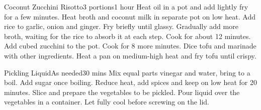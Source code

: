 \documentclass[]{article}
\begin{document}
\begin{center}
\begin{recipe}{Coconut Zucchini Risotto}{3 portions}{1 hour}
	Heat oil in a pot and add lightly fry for a few minutes.
	Heat broth and coconut milk in separate pot on low heat.
	Add rice to garlic, onion and ginger. 
	Fry briefly until glassy.
	\newstep
	Gradually add more broth, waiting for the rice to absorb it at each step.
	Cook for about 12 minutes.
	Add cubed zucchini to the pot. 
	Cook for 8 more minutes.
	Dice tofu and marinade with other ingredients.
	Heat a pan on medium-high heat and fry tofu until crispy.
	\freeform\hrulefill
\end{recipe}

\begin{recipe}{Pickling Liquid}{As needed}{30 mins}
	Mix equal parts vinegar and water, bring to a boil.
	Add sugar once boiling.
	Reduce heat, add spices and keep on low heat for 20 minutes.
	\newstep
	\freeform Slice and prepare the vegetables to be pickled. 
	Pour liquid over the vegetables in a container. 
	Let fully cool before screwing on the lid.
	\freeform\hrulefill
\end{recipe}

\end{center}
\end{document}
